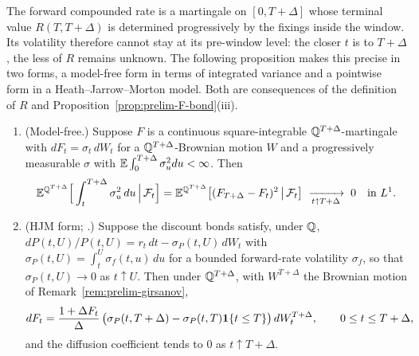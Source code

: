 \documentclass[../../../main.tex]{subfiles}
\begin{document}
The forward compounded rate is a martingale on $[0,T+\Delta]$ whose terminal value $R(T,T+\Delta)$ is determined progressively by the fixings inside the window. Its volatility therefore cannot stay at its pre-window level: the closer $t$ is to $T+\Delta$, the less of $R$ remains unknown. The following proposition makes this precise in two forms, a model-free form in terms of integrated variance and a pointwise form in a Heath--Jarrow--Morton model. Both are consequences of the definition of $R$ and Proposition~\ref{prop:prelim-F-bond}(iii).

\begin{proposition}\label{prop:prelim-vanish}
\begin{enumerate}[nosep,label=(\roman*)]
\item (Model-free.) Suppose $F$ is a continuous square-integrable $\mathbb{Q}^{T+\Delta}$-martingale with $dF_t=\sigma_t\,dW_t$ for a $\mathbb{Q}^{T+\Delta}$-Brownian motion $W$ and a progressively measurable $\sigma$ with $\mathbb{E}\int_0^{T+\Delta}\sigma_u^2du<\infty$. Then
\[
\mathbb{E}^{\mathbb{Q}^{T+\Delta}}\Big[\int_t^{T+\Delta}\sigma_u^2\,du\,\Big|\,\mathcal F_t\Big]=\mathbb{E}^{\mathbb{Q}^{T+\Delta}}\big[(F_{T+\Delta}-F_t)^2\,\big|\,\mathcal F_t\big]\;\xrightarrow[t\uparrow T+\Delta]{}\;0\quad\text{in }L^1 .
\]
\item (HJM form; \cite[Ch.~6]{filipovic2009}.) Suppose the discount bonds satisfy, under $\mathbb{Q}$, $dP(t,U)/P(t,U)=r_t\,dt-\sigma_P(t,U)\,dW_t$ with $\sigma_P(t,U)=\int_t^U\sigma_f(t,u)\,du$ for a bounded forward-rate volatility $\sigma_f$, so that $\sigma_P(t,U)\to0$ as $t\uparrow U$. Then under $\mathbb{Q}^{T+\Delta}$, with $W^{T+\Delta}$ the Brownian motion of Remark~\ref{rem:prelim-girsanov},
\begin{equation}\label{eq:prelim-hjm-F}
dF_t=\frac{1+\Delta F_t}{\Delta}\,\big(\sigma_P(t,T+\Delta)-\sigma_P(t,T)\mathbf{1}\{t\le T\}\big)\,dW^{T+\Delta}_t,\qquad 0\le t\le T+\Delta,
\end{equation}
and the diffusion coefficient tends to $0$ as $t\uparrow T+\Delta$.
\end{enumerate}
\end{proposition}
\end{document}
